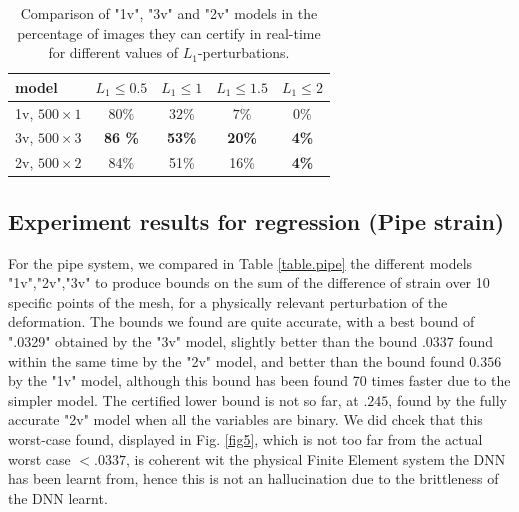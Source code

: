 	
	
\begin{table}[h!]
	\begin{tabular}{||l||c|c|c|c||}\hline\hline
		model &    $L_1\leq 0.5$ & $L_1\leq 1$ & $L_1\leq 1.5$ &  $L_1\leq 2$ \\\hline \hline
		1v, $500\times1$ & $80 \%$ & $32\%$ & $7\%$ & $0\%$ \\\hline
		3v, $500 \times 3$ & {\bf 86 \%} & {\bf 53\%} & {\bf 20\%} & {\bf 4\%} \\\hline
		2v, $500 \times 2$ & 84\% & 51\% & 16\% & {\bf 4\%} \\\hline \hline
	\end{tabular}
	\caption{Comparison of "1v", "3v" and "2v" models 
	in the percentage of images they can certify in real-time for different values of $L_1$-perturbations.}
    \label{table.cert}
\end{table}


	


\subsection{Experiment results for regression (Pipe strain)}
	
	For the pipe system, we compared in Table \ref{table.pipe} the different models "1v","2v","3v" to produce bounds on the sum of the difference of strain over 10 specific points of the mesh, for a physically relevant perturbation of the deformation. The bounds we found are quite accurate, with a best bound of ".0329" obtained by the "3v" model, slightly better than the bound $.0337$ found within the same time by the "2v" model, and better than the bound found $0.356$ by the "1v" model, although this bound has been found 70 times faster due to the simpler model. The certified lower bound is not so far, at $.245$, found by the fully accurate "2v" model when all the variables are binary. We did chcek that this worst-case found, displayed in Fig. \ref{fig5}, which is not too far from the actual worst case $<.0337$, is coherent wit the physical Finite Element system the DNN has been learnt from, hence this is not an hallucination due to the brittleness of the DNN learnt.

